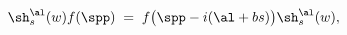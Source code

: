 \begin{equation}\label{shift}
\sh_s^{\al}(w)f(\spp)\;=\;f\big(\spp-i(\al+bs)\big)
\sh_s^{\al}(w),
\end{equation}

